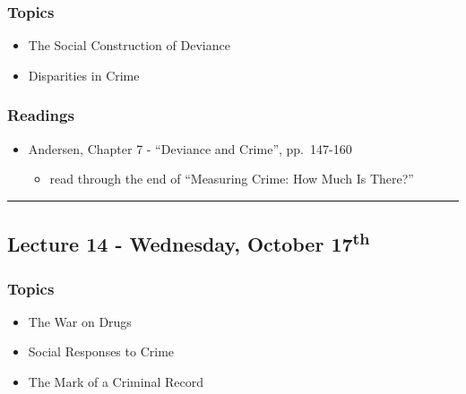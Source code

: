 \documentclass[]{book}
\providecommand{\tightlist}{%
  \setlength{\itemsep}{0pt}\setlength{\parskip}{0pt}}
\theoremstyle{definition}
\theoremstyle{definition}
\theoremstyle{definition}
\theoremstyle{remark}
\begin{document}
\hypertarget{topics-14}{%
\subsubsection*{Topics}\label{topics-14}}

\begin{itemize}
\tightlist
\item
  The Social Construction of Deviance
\item
  Disparities in Crime
\end{itemize}

\hypertarget{readings-13}{%
\subsubsection*{Readings}\label{readings-13}}

\begin{itemize}
\tightlist
\item
  Andersen, Chapter 7 - ``Deviance and Crime'', pp.~147-160

  \begin{itemize}
  \tightlist
  \item
    read through the end of ``Measuring Crime: How Much Is There?''
  \end{itemize}
\end{itemize}

\begin{center}\rule{0.5\linewidth}{\linethickness}\end{center}

\hypertarget{lecture-14---wednesday-october-17th}{%
\subsection*{\texorpdfstring{Lecture 14 - Wednesday, October
17\textsuperscript{th}}{Lecture 14 - Wednesday, October 17th}}\label{lecture-14---wednesday-october-17th}}

\hypertarget{topics-15}{%
\subsubsection*{Topics}\label{topics-15}}

\begin{itemize}
\tightlist
\item
  The War on Drugs
\item
  Social Responses to Crime
\item
  The Mark of a Criminal Record
\end{itemize}
\end{document}
